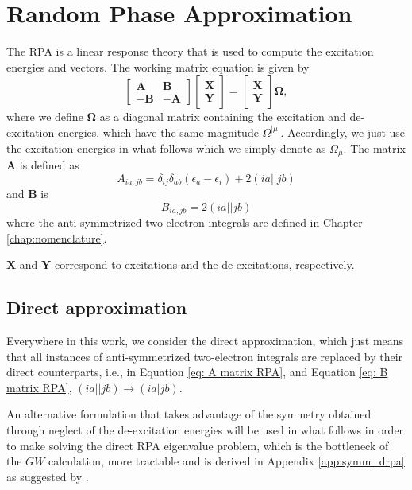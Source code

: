 \documentclass[12pt]{caltech_thesis}
\begin{document}
\section{Random Phase Approximation}
The RPA is a linear response theory that is used to compute the excitation energies and vectors. The working matrix equation is given by \autocite{dreuw_single-reference_2005}
\begin{equation}
\begin{bmatrix}
\textbf{A} & \textbf{B} \\
-\textbf{B} & -\textbf{A}
\end{bmatrix}
\begin{bmatrix}
\textbf{X} \\
\textbf{Y}
\end{bmatrix}
=
\begin{bmatrix}
\textbf{X} \\
\textbf{Y}
\end{bmatrix}
\boldsymbol{\Omega }
,
\label{eq: RPA matrix equation}
\end{equation}
where we define $\boldsymbol{\Omega}$ as a diagonal matrix containing the excitation and de-excitation energies, which have the same magnitude $\Omega^{|\mu|}$. Accordingly, we just use the excitation energies in what follows which we simply denote as $\Omega _{\mu }$. The matrix
$\textbf{A}$ is defined as
\begin{equation}
    A_{ia,jb} = \delta _{ij}\delta _{ab}(\epsilon _{a}- \epsilon _{i}) + 2(ia||jb)
\label{eq: A matrix RPA}
\end{equation}
and $\textbf{B}$ is
\begin{equation}
    B_{ia,jb} = 2(ia||jb)
\label{eq: B matrix RPA}
\end{equation}
where the anti-symmetrized two-electron integrals are defined in Chapter \ref{chap:nomenclature}.

$\textbf{X}$ and $\textbf{Y}$ correspond to excitations and the de-excitations, respectively.
\subsection{Direct approximation}
Everywhere in this work, we consider the direct approximation, which just means that all instances of anti-symmetrized two-electron integrals are replaced by their direct counterparts, i.e., in Equation \ref{eq: A matrix RPA}, and Equation \ref{eq: B matrix RPA}, $(ia||jb) \rightarrow (ia|jb)$.

An alternative formulation that takes advantage of the symmetry obtained through neglect of the de-excitation energies will be used in what follows in order to make solving the direct RPA eigenvalue problem, which is the bottleneck of the $GW$ calculation, more tractable and is derived in Appendix \ref{app:symm_drpa} as suggested by \textcite{furche_density_2001}.
\end{document}
